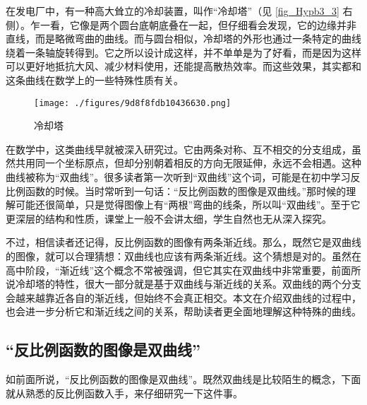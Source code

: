 
\begin{issues}
\issueDraft
\end{issues}


在发电厂中，有一种高大耸立的冷却装置，叫作“冷却塔”（见 \autoref{fig_Hypb3_3} 右侧）。乍一看，它像是两个圆台底朝底叠在一起，但仔细看会发现，它的边缘并非直线，而是略微弯曲的曲线。而与圆台相似，冷却塔的外形也通过一条特定的曲线绕着一条轴旋转得到。它之所以设计成这样，并不单单是为了好看，而是因为这样可以更好地抵抗大风、减少材料使用，还能提高散热效率。而这些效果，其实都和这条曲线在数学上的一些特殊性质有关。

\begin{figure}[ht]
\centering
\texttt{[image: ./figures/9d8f8fdb10436630.png]}
\caption{冷却塔} \label{fig_Hypb3_3}
\end{figure}

在数学中，这类曲线早就被深入研究过。它由两条对称、互不相交的分支组成，虽然共用同一个坐标原点，但却分别朝着相反的方向无限延伸，永远不会相遇。这种曲线被称为“双曲线”。很多读者第一次听到“双曲线”这个词，可能是在初中学习反比例函数的时候。当时常听到一句话：“反比例函数的图像是双曲线。”那时候的理解可能还很简单，只是觉得图像上有“两根”弯曲的线条，所以叫“双曲线”。至于它更深层的结构和性质，课堂上一般不会讲太细，学生自然也无从深入探究。

不过，相信读者还记得，反比例函数的图像有两条渐近线。那么，既然它是双曲线的图像，就可以合理猜想：双曲线也应该有两条渐近线。这个猜想是对的。虽然在高中阶段，“渐近线”这个概念不常被强调，但它其实在双曲线中非常重要，前面所说冷却塔的特性，很大一部分就是基于双曲线与渐近线的关系。双曲线的两个分支会越来越靠近各自的渐近线，但始终不会真正相交。本文在介绍双曲线的过程中，也会进一步分析它和渐近线之间的关系，帮助读者更全面地理解这种特殊的曲线。

\subsection{“反比例函数的图像是双曲线”}

如前面所说，“反比例函数的图像是双曲线”。既然双曲线是比较陌生的概念，下面就从熟悉的反比例函数入手，来仔细研究一下这件事。

